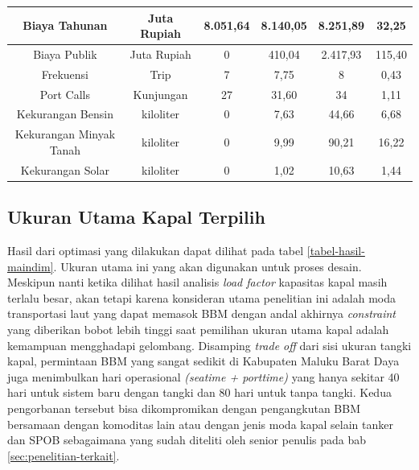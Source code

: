 \begin{table}[!ht]
\begin{tabular}{|cccccc|}
    \multicolumn{1}{|c|}{Biaya Tahunan}           & \multicolumn{1}{c|}{Juta Rupiah} & \multicolumn{1}{c|}{8.051,64} & \multicolumn{1}{c|}{8.140,05} & \multicolumn{1}{c|}{8.251,89} & 32,25     \\ \hline
    \multicolumn{1}{|c|}{Biaya Publik}            & \multicolumn{1}{c|}{Juta Rupiah} & \multicolumn{1}{c|}{0}        & \multicolumn{1}{c|}{410,04}   & \multicolumn{1}{c|}{2.417,93} & 115,40    \\ \hline
    \multicolumn{1}{|c|}{Frekuensi}               & \multicolumn{1}{c|}{Trip}        & \multicolumn{1}{c|}{7}        & \multicolumn{1}{c|}{7,75}     & \multicolumn{1}{c|}{8}        & 0,43      \\ \hline
    \multicolumn{1}{|c|}{Port Calls}              & \multicolumn{1}{c|}{Kunjungan}   & \multicolumn{1}{c|}{27}       & \multicolumn{1}{c|}{31,60}    & \multicolumn{1}{c|}{34}       & 1,11      \\ \hline
    \multicolumn{1}{|c|}{Kekurangan Bensin}       & \multicolumn{1}{c|}{kiloliter}   & \multicolumn{1}{c|}{0}        & \multicolumn{1}{c|}{7,63}     & \multicolumn{1}{c|}{44,66}    & 6,68      \\ \hline
    \multicolumn{1}{|c|}{Kekurangan Minyak Tanah} & \multicolumn{1}{c|}{kiloliter}   & \multicolumn{1}{c|}{0}        & \multicolumn{1}{c|}{9,99}     & \multicolumn{1}{c|}{90,21}    & 16,22     \\ \hline
    \multicolumn{1}{|c|}{Kekurangan Solar}        & \multicolumn{1}{c|}{kiloliter}   & \multicolumn{1}{c|}{0}        & \multicolumn{1}{c|}{1,02}     & \multicolumn{1}{c|}{10,63}    & 1,44      \\ \hline
    \end{tabular}
    \end{table}


\subsection{Ukuran Utama Kapal Terpilih}
\label{subsec:ukuran-utama}

Hasil dari optimasi yang dilakukan dapat dilihat pada tabel \ref{tabel-hasil-maindim}. Ukuran utama ini yang akan digunakan untuk proses desain. Meskipun nanti ketika dilihat hasil analisis \emph{load factor} kapasitas kapal masih terlalu besar, akan tetapi karena konsideran utama penelitian ini adalah moda transportasi laut yang dapat memasok BBM dengan andal akhirnya \emph{constraint} yang diberikan bobot lebih tinggi saat pemilihan ukuran utama kapal adalah kemampuan mengghadapi gelombang. Disamping \emph{trade off} dari sisi ukuran tangki kapal, permintaan BBM yang sangat sedikit di Kabupaten Maluku Barat Daya juga menimbulkan hari operasional \emph{(seatime + porttime)} yang hanya sekitar 40 hari untuk sistem baru dengan tangki dan 80 hari untuk tanpa tangki. Kedua pengorbanan tersebut bisa dikompromikan dengan pengangkutan BBM bersamaan dengan komoditas lain atau dengan jenis moda kapal selain tanker dan SPOB sebagaimana yang sudah diteliti oleh senior penulis pada bab \ref{sec:penelitian-terkait}.

